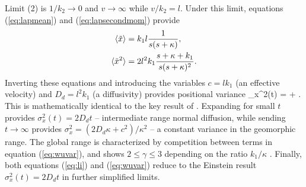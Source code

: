Limit (2) is $1/k_2 \rightarrow 0$ and $v\rightarrow \infty$ while $v/k_2 = l$. Under this limit, equations (\ref{eq:lapmean}) and (\ref{eq:lapsecondmom}) provide
\begin{align}
	\langle \tilde{x} \rangle &= k_1l\frac{1}{s(s+\kappa)},\\
	\langle \tilde{x}^2 \rangle &= 2l^2k_1 \frac{s+\kappa+k_1}{s(s+\kappa)^2}.
\end{align}
Inverting these equations and introducing the variables $c=lk_1$ (an effective velocity) and $D_d = l^2k_1$ (a diffusivity) provides positional variance
\be \sigma_x^2(t) =  + . \label{eq:wuvar}\ee
This is mathematically identical to the key result of \citet{Wu2019}.
Expanding for small $t$ provides $\sigma_x^2(t) = 2D_d t$ -- intermediate range normal diffusion, while sending $t\rightarrow \infty$ provides $\sigma_x^2 = (2D_d\kappa + c^2)/\kappa^2$ -- a constant variance in the geomorphic range.
The global range is characterized by competition between terms in equation (\ref{eq:wuvar}), and shows $2 \leq \gamma \leq 3$ depending on the ratio $k_1/\kappa$ \citep[cf.,][]{Wu2019}.
Finally, both equations (\ref{eq:li}) and (\ref{eq:wuvar}) reduce to the Einstein result $\sigma_x^2(t) = 2D_d t$ in further simplified limits.